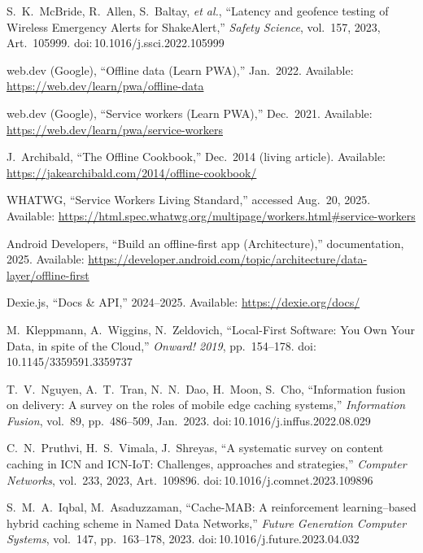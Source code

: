 \documentclass[11pt,twocolumn]{article}
\begin{document}
\begin{thebibliography}{99}
S.\ K.\ McBride, R.\ Allen, S.\ Baltay, \emph{et al.}, ``Latency and geofence testing of Wireless Emergency Alerts for ShakeAlert,'' \emph{Safety Science}, vol.\ 157, 2023, Art.\ 105999. doi:\,10.1016/j.ssci.2022.105999

web.dev (Google), ``Offline data (Learn PWA),'' Jan.\ 2022. Available: \url{https://web.dev/learn/pwa/offline-data}

web.dev (Google), ``Service workers (Learn PWA),'' Dec.\ 2021. Available: \url{https://web.dev/learn/pwa/service-workers}

J.\ Archibald, ``The Offline Cookbook,'' Dec.\ 2014 (living article). Available: \url{https://jakearchibald.com/2014/offline-cookbook/}

WHATWG, ``Service Workers Living Standard,'' accessed Aug.\ 20, 2025. Available: \url{https://html.spec.whatwg.org/multipage/workers.html#service-workers}

Android Developers, ``Build an offline-first app (Architecture),'' documentation, 2025. Available: \url{https://developer.android.com/topic/architecture/data-layer/offline-first}

Dexie.js, ``Docs \& API,'' 2024--2025. Available: \url{https://dexie.org/docs/}

M.\ Kleppmann, A.\ Wiggins, N.\ Zeldovich, ``Local-First Software: You Own Your Data, in spite of the Cloud,'' \emph{Onward! 2019}, pp.\ 154--178. doi:\,10.1145/3359591.3359737

T.\ V.\ Nguyen, A.\ T.\ Tran, N.\ N.\ Dao, H.\ Moon, S.\ Cho, ``Information fusion on delivery: A survey on the roles of mobile edge caching systems,'' \emph{Information Fusion}, vol.\ 89, pp.\ 486--509, Jan.\ 2023. doi:\,10.1016/j.inffus.2022.08.029

C.\ N.\ Pruthvi, H.\ S.\ Vimala, J.\ Shreyas, ``A systematic survey on content caching in ICN and ICN-IoT: Challenges, approaches and strategies,'' \emph{Computer Networks}, vol.\ 233, 2023, Art.\ 109896. doi:\,10.1016/j.comnet.2023.109896

S.\ M.\ A.\ Iqbal, M.\ Asaduzzaman, ``Cache-MAB: A reinforcement learning–based hybrid caching scheme in Named Data Networks,'' \emph{Future Generation Computer Systems}, vol.\ 147, pp.\ 163--178, 2023. doi:\,10.1016/j.future.2023.04.032


\end{thebibliography}
\end{document}
